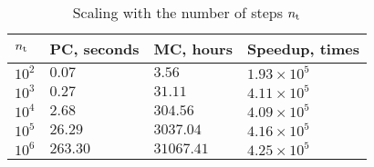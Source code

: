 \begin{table}[h]
  \vspace{-0.5em}
  \caption{Scaling with the number of steps \textnormal{${n_\text{t}}$}}
  \vspace{-0.5em}
  \begin{tabular*}{1\linewidth}{L{40pt}R{50pt}R{50pt}R{60pt}}
    \toprule
    ${n_\text{t}}$ & PC, seconds & MC, hours & Speedup, times \\
    \midrule
    \midrule
    $10^2$ & $  0.07$ & $    3.56$ & $1.93 \times 10^5$ \\
    $10^3$ & $  0.27$ & $   31.11$ & $4.11 \times 10^5$ \\
    $10^4$ & $  2.68$ & $  304.56$ & $4.09 \times 10^5$ \\
    $10^5$ & $ 26.29$ & $ 3037.04$ & $4.16 \times 10^5$ \\
    $10^6$ & $263.30$ & $31067.41$ & $4.25 \times 10^5$ \\
    \bottomrule
  \end{tabular*}
  \vspace{-0.5em}
\end{table}
